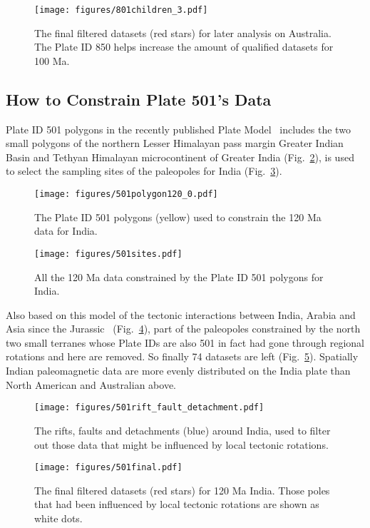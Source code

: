 \begin{figure}
\texttt{[image: figures/801children\_3.pdf]}
\caption{The final filtered datasets (red stars) for later analysis on
Australia. The Plate ID 850 helps increase the amount of qualified datasets for
100 Ma.}\label{fig_AUfinal}
\end{figure}

\subsection{How to Constrain Plate 501's Data}
Plate ID 501 polygons in the recently published Plate Model~\cite{Y18} includes
the two small polygons of the northern Lesser Himalayan pass margin Greater
Indian Basin and Tethyan Himalayan microcontinent of Greater India
(Fig.~\ref{fig_INpolygon}), is used to select the sampling
sites of the paleopoles for India (Fig.~\ref{fig_INpmdata}).

\begin{figure}
\texttt{[image: figures/501polygon120\_0.pdf]}
\caption{The Plate ID 501 polygons (yellow) used to constrain the
120 Ma data for India.}\label{fig_INpolygon}
\end{figure}

\begin{figure}
\texttt{[image: figures/501sites.pdf]}
\caption{All the 120 Ma data constrained by the Plate ID 501
polygons for India.}\label{fig_INpmdata}
\end{figure}

Also based on this model of the tectonic interactions between India, Arabia and
Asia since the Jurassic~\cite{G15} (Fig.~\ref{fig_INrfd}), part of the
paleopoles constrained by the north two small terranes whose Plate IDs are also
501 in fact had gone through regional rotations and here are removed. So finally
74 datasets are left (Fig.~\ref{fig_INfinal}). Spatially Indian paleomagnetic
data are more evenly distributed on the India plate than North American and
Australian above.

\begin{figure}
\texttt{[image: figures/501rift\_fault\_detachment.pdf]}
\caption{The rifts, faults and detachments (blue) around India, used to
filter out those data that might be influenced by local tectonic
rotations.}\label{fig_INrfd}
\end{figure}

\begin{figure}
\texttt{[image: figures/501final.pdf]}
\caption{The final filtered datasets (red stars) for 120 Ma India.
Those poles that had been influenced by local tectonic rotations are shown as
white dots.}\label{fig_INfinal}
\end{figure}

